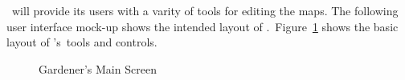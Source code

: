\MapEditor\ will provide its users with a varity of tools for editing the maps. The following user interface mock-up shows the intended layout of \MapEditor.\  Figure~\ref{fig:map-editor} shows the basic layout of \MapEditor's\ tools and controls.

\begin{figure}[htbp]
  \centering
  \caption{Gardener's Main Screen}
  \label{fig:map-editor}
\end{figure}
